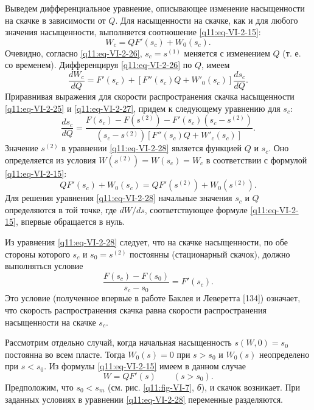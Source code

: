 Выведем дифференциальное уравнение, описывающее изменение насыщенности на скачке в зависимости от $Q$. Для насыщенности на скачке, как и для любого значения насыщенности, выполняется соотношение \eqref{q11:eq-VI-2-15}:
\begin{equation}W_c=QF'(s_c)+W_0(s_c).\tag{VI.2.26}\label{q11:eq-VI-2-26}\end{equation}
Очевидно, согласно \eqref{q11:eq-VI-2-26}, $s_c=s^{(1)}$ меняется с изменением $Q$ (т. е. со временем). Дифференцируя \eqref{q11:eq-VI-2-26} по $Q$, имеем
\begin{equation}\frac{dW_c}{dQ}=F'(s_c)+[F''(s_c)Q+W'_0(s_c)]\frac{ds_c}{dQ}.\tag{VI.2.27}\label{q11:eq-VI-2-27}\end{equation}
Приравнивая выражения для скорости распространения скачка насыщенности \eqref{q11:eq-VI-2-25} и \eqref{q11:eq-VI-2-27}, придем к следующему уравнению для $s_c$:
\begin{equation}\frac{ds_c}{dQ}=\frac{F(s_c)-F(s^{(2)})-F'(s_c)(s_c-s^{(2)})}{(s_c-s^{(2)})[F''(s_c)Q+W'_c(s_c)]}.\tag{VI.2.28}\label{q11:eq-VI-2-28}\end{equation}
Значение $s^{(2)}$ в уравнении \eqref{q11:eq-VI-2-28} является функцией $Q$ и $s_c$. Оно определяется из условия $W(s^{(2)})=W(s_c)=W_c$ в соответствии с формулой \eqref{q11:eq-VI-2-15}:
\begin{equation}QF'(s_c)+W_0(s_c)=QF'(s^{(2)})+W_0(s^{(2)}).\tag{VI.2.29}\label{q11:eq-VI-2-29}\end{equation}
Для решения уравнения \eqref{q11:eq-VI-2-28} начальные значения $s_c$ и $Q$ определяются в той точке, где $dW/ds$, соответствующее формуле \eqref{q11:eq-VI-2-15}, впервые обращается в нуль.

Из уравнения \eqref{q11:eq-VI-2-28} следует, что на скачке насыщенности, по обе стороны которого $s_c$ и $s_0=s^{(2)}$ постоянны (стационарный скачок), должно выполняться условие
\begin{equation}\frac{F(s_c)-F(s_0)}{s_c-s_0}=F'(s_c).\tag{VI.2.30}\label{q11:eq-VI-2-30}\end{equation}
Это условие (полученное впервые в работе Баклея и Леверетта [134]) означает, что скорость распространения скачка равна скорости распространения насыщенности на скачке $s_c$.

Рассмотрим отдельно случай, когда начальная насыщенность $s(W,0)=s_0$ постоянна во всем пласте. Тогда $W_0(s)=0$ при $s>s_0$ и $W_0(s)$ неопределено при $s<s_0$. Из формулы \eqref{q11:eq-VI-2-15} имеем в данном случае
\[W=QF'(s)\qquad(s>s_0).\]
Предположим, что $s_0<s_m$ (см. рис. \ref{q11:fig-VI-7}, \textit{б}), и скачок возникает. При заданных условиях в уравнении \eqref{q11:eq-VI-2-28} переменные разделяются.

